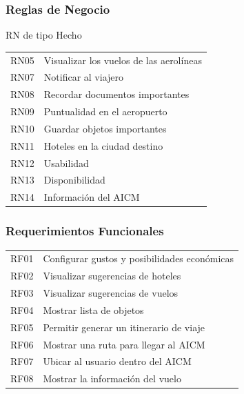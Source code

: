 \documentclass[12pt]{beamer}
\begin{document}
\begin{frame}
	\frametitle{Reglas de Negocio}
	\begin{block}{RN de tipo Hecho}
	\begin{center}
	

	\begin{tabular}{c|l}
			RN05 & Visualizar los vuelos de las aerolíneas \\
			RN07 & Notificar al viajero \\
			RN08 & Recordar documentos importantes\\
      		RN09 & Puntualidad en el aeropuerto\\
      		RN10 & Guardar objetos importantes\\
      		RN11 & Hoteles en la ciudad destino\\
      		RN12 & Usabilidad\\
      		RN13 & Disponibilidad\\
      		RN14 & Información del AICM\\
		\end{tabular}
			\end{center}
		\end{block}
\end{frame}


\begin{frame}
	\frametitle{Requerimientos Funcionales}
	\begin{block}{}
	\begin{center}
	

	\begin{tabular}{c|l}
			RF01 & Configurar gustos y posibilidades económicas \\
			RF02 & Visualizar sugerencias de hoteles \\
			RF03 & Visualizar sugerencias de vuelos\\
      		RF04 & Mostrar lista de objetos\\
      		RF05 & Permitir generar un itinerario de viaje\\
      		RF06 & Mostrar una ruta para llegar al AICM\\
      		RF07 & Ubicar al usuario dentro del AICM\\
      		RF08 & Mostrar la información del vuelo\\
		\end{tabular}
			\end{center}
		\end{block}
\end{frame}
\end{document}
